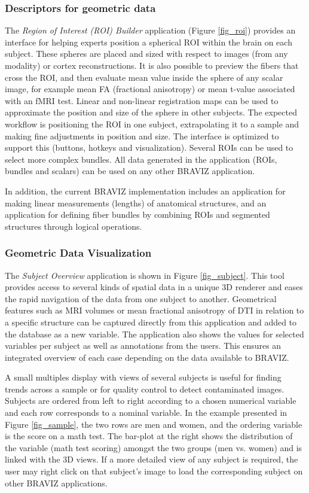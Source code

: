 \documentclass[twocolumn]{svjour3}
\begin{document}
\subsubsection{Descriptors for geometric data}

The \emph{Region of Interest (ROI) Builder} application (Figure \ref{fig_roi}) provides an interface for helping experts position a spherical ROI within the brain on each subject. These spheres are placed and sized with respect to images (from any modality) or cortex reconstructions. It is also possible to preview the fibers that cross the ROI, and then evaluate mean value inside the sphere of any scalar image, for example mean FA (fractional anisotropy) or mean t-value associated with an fMRI test. 
Linear and non-linear registration maps can be used to approximate the position and size of the sphere in other subjects. The expected workflow is positioning the ROI in one subject, extrapolating it to a sample and making fine adjustments in position and size. The interface is optimized to support this (buttons, hotkeys and visualization). Several ROIs can be used to select more complex bundles. All data generated in the application (ROIs, bundles and scalars) can be used on any other BRAVIZ application. 

In addition, the current BRAVIZ implementation includes an application for making linear measurements (lengths) of anatomical structures, and an application for defining fiber bundles by combining ROIs and segmented structures through logical operations.


\subsubsection{Geometric Data Visualization}

The \emph{Subject Overview} application is shown in Figure \ref{fig_subject}. This tool  provides access to several kinds of spatial data in a unique 3D renderer and eases the rapid navigation of the data from one subject to another. Geometrical features such as MRI volumes or mean fractional anisotropy of DTI in relation to a specific structure can be captured directly from this application and added to the database as a new variable. The application also shows the values for selected variables per subject as well as annotations from the users. This ensures an integrated overview of each case depending on the data available to BRAVIZ.

A small multiples display \cite{tufte_visual_1983} with views  of several subjects is useful for finding trends across a sample or for quality control to detect contaminated images. Subjects are ordered from left to right according to a chosen numerical variable and each row corresponds to a nominal variable. In the example presented in Figure \ref{fig_sample}, the two rows are men and women, and the ordering variable is the score on a math test. The bar-plot at the right shows the distribution of the variable (math test scoring) amongst the two groups (men vs. women) and is linked with the 3D views. If a more detailed view of any subject is required, the user may right click on that subject’s image to load the corresponding subject on other BRAVIZ applications.
\end{document}

